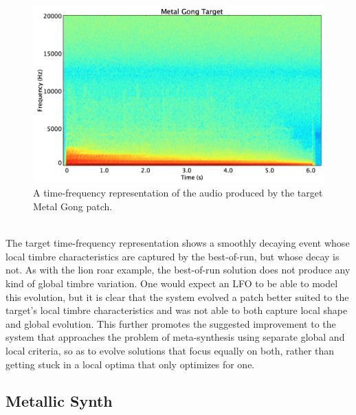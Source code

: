 \documentclass[12pt]{report} 	%
\numberwithin{figure}{chapter}
\numberwithin{table}{chapter}
\numberwithin{equation}{chapter}
\begin{document}
\begin{flushleft}
\begin{figure}[h!]
\begin{center}
\includegraphics[scale=0.34]{MetalGongTargetSTFT}
\caption[Target metal gong time-frequency representation]{A time-frequency representation of the audio produced by the target Metal Gong patch.}
\end{center}
\vspace{6pt}
\end{figure}
\\
The target time-frequency representation shows a smoothly decaying event whose local timbre characteristics are captured by the best-of-run, but whose decay is not. As with the lion roar example, the best-of-run solution does not produce any kind of global timbre variation. One would expect an LFO to be able to model this evolution, but it is clear that the system evolved a patch better suited to the target's local timbre characteristics and was not able to both capture local shape and global evolution. This further promotes the suggested improvement to the system that approaches the problem of meta-synthesis using separate global and local criteria, so as to evolve solutions that focus equally on both, rather than getting stuck in a local optima that only optimizes for one.
\clearpage

\subsection{Metallic Synth}


\end{flushleft}
\end{document}
